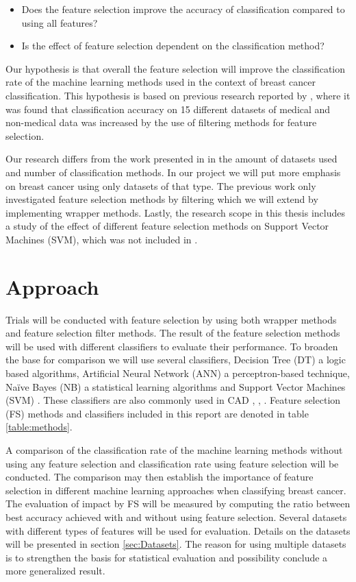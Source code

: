 \begin{itemize}
  \item Does the feature selection improve the accuracy of classification compared to using all features?
  \item Is the effect of feature selection dependent on the classification method?
\end{itemize}

Our hypothesis is that overall the feature selection will improve the classification rate of the machine learning methods used in the context of breast cancer classification. This hypothesis is based on previous research reported by \textcite{karabulut2012}, where it was found that classification accuracy on 15 different datasets of medical and non-medical data was increased by the use of filtering methods for feature selection.

Our research differs from the work presented in \parencite{karabulut2012} in the amount of datasets used and number of classification methods. In our project we will put more emphasis on breast cancer using only datasets of that type. The previous work only investigated feature selection methods by filtering which we will extend by implementing wrapper methods. Lastly, the research scope in this thesis includes a study of the effect of different feature selection methods on Support Vector Machines (SVM), which was not included in \parencite{karabulut2012}.


\section{Approach}

Trials will be conducted with feature selection by using both wrapper methods and feature selection filter methods. The result of the feature selection methods will be used with different classifiers to evaluate their performance. To broaden the base for comparison we will use several classifiers, Decision Tree (DT) a logic based algorithms, Artificial Neural Network (ANN) a perceptron-based technique, Naïve Bayes (NB) a statistical learning algorithms and Support Vector Machines (SVM) \parencite{wallace2007}. These classifiers are also commonly used in CAD \parencite{ramos2012}, \parencite{akay2009}, \parencite{li2007}. Feature selection (FS) methods and classifiers included in this report are denoted in table \ref{table:methods}.



A comparison of the classification rate of the machine learning methods without using any feature selection and classification rate using feature selection will be conducted. The comparison may then establish the importance of feature selection in different machine learning approaches when classifying breast cancer. The evaluation of impact by FS will be measured by computing the ratio between best accuracy achieved with and without using feature selection. Several datasets with different types of features will be used for evaluation. Details on the datasets will be presented in section \ref{sec:Datasets}. The reason for using multiple datasets is to strengthen the basis for statistical evaluation and possibility conclude a more generalized result.


